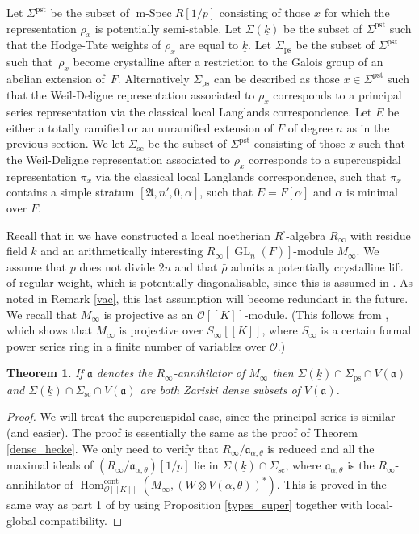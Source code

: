 \documentclass[JEP,XML,SOM,Unicode,NoEqCountersInSection]{cedram}
\let\mathcal\mathscr
\newcommand{\ssquare}{{\scriptscriptstyle\square}}
\newcommand{\rps}{\mathrm{ps}}
\newcommand{\rsc}{\mathrm{sc}}
\newtheorem{thm}[prop]{Theorem}
\theoremstyle{definition}
\DeclareMathOperator{\Hom}{Hom}
\DeclareMathOperator{\GL}{GL}
\DeclareMathOperator{\mSpec}{m-Spec}
\newcommand{\br}[1]{[\![#1]\!]}
\newcommand{\Aa}{\mathfrak A}
\newcommand{\cO}{\mathcal{O}}
\newcommand{\cont}{\mathrm{cont}}
\newcommand{\pst}{\mathrm{pst}}
\newcommand{\rhobar}{\bar{\rho}}
\begin{document}
Let $\Sigma^{\pst}$ be the subset of $\mSpec R[1/p]$ consisting of those
$x$ for which the representation $\rho_x$ is potentially semi-stable. Let $\Sigma(\underline{k})$ be the subset of $\Sigma^{\pst}$
such that the Hodge-Tate weights of $\rho_x$ are equal to $\underline{k}$. Let $\Sigma_{\rps}$ be the subset of $\Sigma^{\pst}$
such that~$\rho_x$ become crystalline after a restriction to the Galois group of an abelian extension of~$F$. Alternatively $\Sigma_{\rps}$ can be described
as those $x\in \Sigma^{\pst}$ such that the Weil-Deligne representation associated to $\rho_x$ corresponds to a principal series representation via the
classical local Langlands correspondence. Let $E$ be either a totally ramified or an unramified extension of $F$ of degree $n$ as in the previous section. We
let $\Sigma_{\rsc}$ be the subset of $\Sigma^{\pst}$ consisting of those $x$ such that the Weil-Deligne representation associated to $\rho_x$ corresponds to
a supercuspidal representation $\pi_x$ via the classical local Langlands correspondence, such that $\pi_x$ contains a simple stratum $[\Aa, n', 0, \alpha]$, such that $E=F[\alpha]$ and $\alpha$ is minimal over $F$.

Recall that in \cite{six-authors} we have constructed a local noetherian $R^\ssquare$-algebra $R_{\infty}$ with residue field $k$ and an arithmetically interesting $R_{\infty}[\GL_n(F)]$-module $M_{\infty}$. We assume that
$p$ does not divide $2n$ and that $\rhobar$ admits a potentially crystalline lift of regular weight, which is
potentially diagonalisable, since this is assumed in \cite{six-authors}. As noted in Remark \ref{vac}, this last assumption will become redundant in the future.
We recall that $M_{\infty}$ is projective as an $\cO\br{K}$-module.
(This follows from \cite[Prop.\,2.10]{six-authors}, which
shows that $M_{\infty}$ is projective over $S_{\infty}\br{K}$,
where $S_{\infty}$ is a certain formal power series ring in a finite
number of variables over $\cO$.)

\begin{thm}\label{capture_local} If $\mathfrak a$ denotes
the $R_{\infty}$-annihilator of $M_{\infty}$
then $\Sigma(\underline{k}) \cap \Sigma_{\rps}\cap V(\mathfrak a)$ and
$\Sigma(\underline{k}) \cap \Sigma_{\rsc}\cap V(\mathfrak a)$ are both Zariski dense
subsets of $V(\mathfrak a)$.
\end{thm}

\begin{proof} We will treat the supercuspidal case, since
the principal series is similar (and easier).
The proof is essentially the same as the proof of Theorem \ref{dense_hecke}. We only need to verify that $R_{\infty}/\mathfrak a_{\alpha, \theta}$ is reduced and all the maximal ideals of $(R_{\infty}/\mathfrak a_{\alpha, \theta})[1/p]$ lie in $\Sigma(\underline{k})\cap \Sigma_{\rsc}$, where
$\mathfrak a_{\alpha, \theta}$ is the $R_{\infty}$-annihilator of $\Hom_{\cO\br{K}}^{\cont}(M_\infty, (W\otimes V(\alpha, \theta))^*)$. This is proved in the same way as
part 1 of \cite[Lem.\,4.17]{six-authors} by using Proposition \ref{types_super} together with local-global compatibility.
\end{proof}
\end{document}

